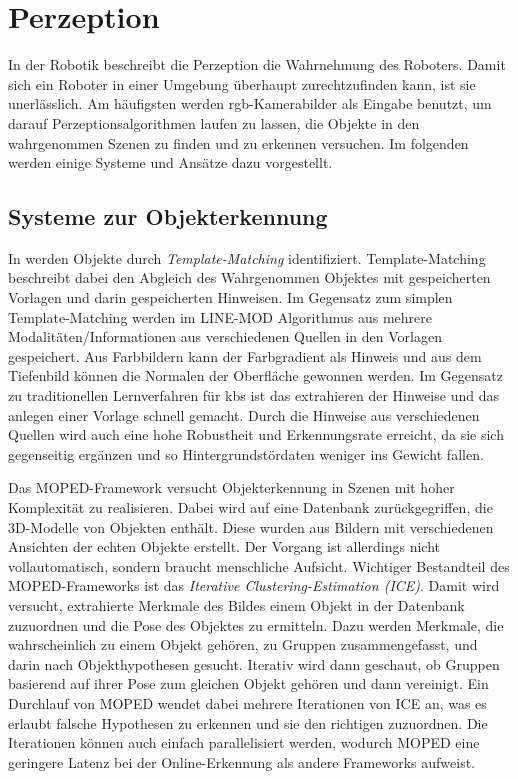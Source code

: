 \section{Perzeption}
In der Robotik beschreibt die Perzeption die Wahrnehmung des Roboters. Damit sich ein Roboter in einer Umgebung überhaupt zurechtzufinden kann, ist sie unerlässlich. Am häufigsten werden \gls{rgb}-Kamerabilder als Eingabe benutzt, um darauf Perzeptionsalgorithmen laufen zu lassen, die Objekte in den wahrgenommen Szenen zu finden und zu erkennen versuchen. Im folgenden werden einige Systeme und Ansätze dazu vorgestellt.

\subsection{Systeme zur Objekterkennung}

In \cite{multimodalTemplate} werden Objekte durch \textit{Template-Matching} identifiziert. Template-Matching beschreibt dabei den Abgleich des Wahrgenommen Objektes mit gespeicherten Vorlagen und darin gespeicherten Hinweisen. Im Gegensatz zum simplen Template-Matching werden im LINE-MOD Algorithmus aus \cite{multimodalTemplate} mehrere Modalitäten/Informationen aus verschiedenen Quellen in den Vorlagen gespeichert. Aus Farbbildern kann der Farbgradient als Hinweis und aus dem Tiefenbild können die Normalen der Oberfläche gewonnen werden. Im Gegensatz zu traditionellen Lernverfahren für \glspl{kb} ist das extrahieren der Hinweise und das anlegen einer Vorlage schnell gemacht. Durch die Hinweise aus verschiedenen Quellen wird auch eine hohe Robustheit und Erkennungsrate erreicht, da sie sich gegenseitig ergänzen und so Hintergrundstördaten weniger ins Gewicht fallen. \par

Das MOPED-Framework \cite{moped} versucht Objekterkennung in Szenen mit hoher Komplexität zu realisieren. Dabei wird auf eine Datenbank zurückgegriffen, die 3D-Modelle von Objekten enthält. Diese wurden aus Bildern mit verschiedenen Ansichten der echten Objekte erstellt. Der Vorgang ist allerdings nicht vollautomatisch, sondern braucht menschliche Aufsicht. Wichtiger Bestandteil des MOPED-Frameworks ist das \textit{Iterative Clustering-Estimation (ICE)}. Damit wird versucht, extrahierte Merkmale des Bildes einem Objekt in der Datenbank zuzuordnen und die Pose des Objektes zu ermitteln. Dazu werden Merkmale, die wahrscheinlich zu einem Objekt gehören, zu Gruppen zusammengefasst, und darin nach Objekthypothesen gesucht. Iterativ wird dann geschaut, ob Gruppen basierend auf ihrer Pose zum gleichen Objekt gehören und dann vereinigt. Ein Durchlauf von MOPED wendet dabei mehrere Iterationen von ICE an, was es erlaubt falsche Hypothesen zu erkennen und sie den richtigen zuzuordnen. Die Iterationen können auch einfach parallelisiert werden, wodurch MOPED eine geringere Latenz bei der Online-Erkennung als andere Frameworks aufweist.  \par

